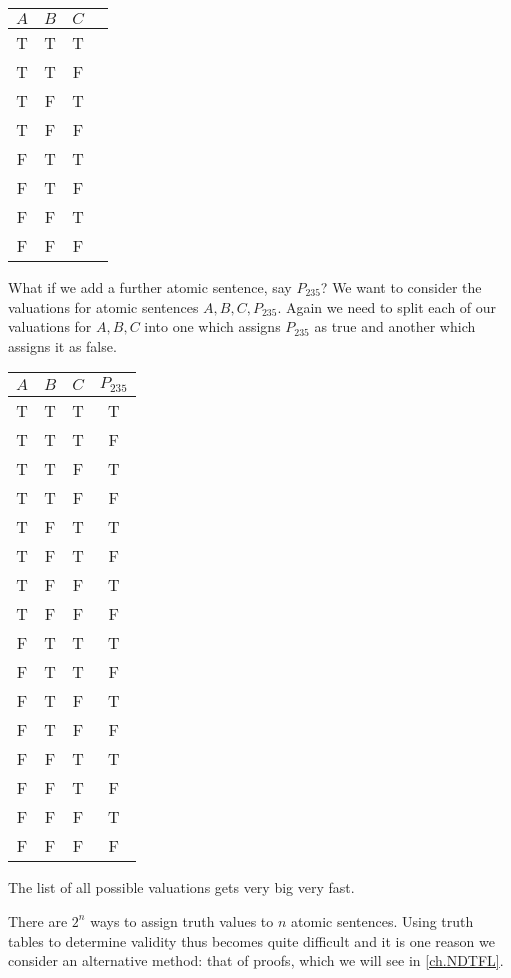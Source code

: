 \begin{center}
	\begin{tabular}{cccc}
		$A$&$B$&$C$&\\\hline
		T& T &T&\\
		T & T & F&\\
		T & F & T& \\
		T & F &F&\\
		F & T &T&\\
		F& T & F & \\
		F & F & T &\\
		F & F & F& 
	\end{tabular}
\end{center}


What if we add a further atomic sentence, say $P_{235}$? We want to consider the valuations for atomic sentences $A,B,C,P_{235}$.
Again we need to split each of our valuations for $A,B,C$ into one which assigns $P_{235}$ as true and another which assigns it as false. 

\begin{center} \begin{tabular}{cccc} $A$ & $B$ & $C$ & $P_{235}$\\\hline T & T & T & T\\ T & T & T & F\\ T & T & F & T\\ T & T & F & F\\ T & F & T & T\\ T & F & T & F\\ T & F & F & T\\ T & F & F & F\\ F & T & T & T\\ F & T & T & F\\ F & T & F & T\\ F & T & F & F\\ F & F & T & T\\ F & F & T & F\\ F & F & F & T\\ F & F & F & F \end{tabular} \end{center}


The list of all possible valuations gets very big very fast.

There are $2^n$ ways to assign truth values to $n$ atomic sentences. Using truth tables to determine validity thus becomes quite difficult and it is one reason we consider an alternative method: that of proofs, which we will see in \ref{ch.NDTFL}.


